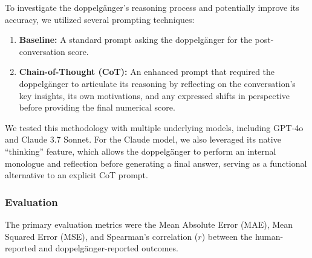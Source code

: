 
To investigate the doppelgänger's reasoning process and potentially improve its accuracy, we utilized several prompting techniques:

\begin{enumerate}
    \item \textbf{Baseline:} A standard prompt asking the doppelgänger for the post-conversation score.
    \item \textbf{Chain-of-Thought (CoT):} An enhanced prompt that required the doppelgänger to articulate its reasoning by reflecting on the conversation's key insights, its own motivations, and any expressed shifts in perspective before providing the final numerical score.
\end{enumerate}

We tested this methodology with multiple underlying models, including GPT-4o and Claude 3.7 Sonnet. For the Claude model, we also leveraged its native ``thinking'' feature, which allows the doppelgänger to perform an internal monologue and reflection before generating a final answer, serving as a functional alternative to an explicit CoT prompt.

\subsubsection{Evaluation}
The primary evaluation metrics were the Mean Absolute Error (MAE), Mean Squared Error (MSE), and Spearman's correlation ($r$) between the human-reported and doppelgänger-reported outcomes.

